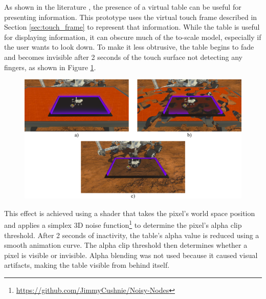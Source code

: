         As shown in the literature \cite{zielaskoMenusDeskSystem2019, sousaVRRRRoomVirtualReality2017, zielaskoNonStationaryOfficeDesk2019}, the presence of a virtual table can be useful for presenting information. This prototype uses the virtual touch frame described in Section \ref{sec:touch_frame} to represent that information. While the table is useful for displaying information, it can obscure much of the to-scale model, especially if the user wants to look down. To make it less obtrusive, the table begins to fade and becomes invisible after 2 seconds of the touch surface not detecting any fingers, as shown in Figure \ref{fig:table_visibility}.

        \begin{figure}[h!]
            \centering
            \includegraphics[width=1\textwidth]{figures/table_visibility.png}
            \label{fig:table_visibility}
        \end{figure}

        This effect is achieved using a shader that takes the pixel's world space position and applies a simplex 3D noise function\footnote{\url{https://github.com/JimmyCushnie/Noisy-Nodes}} to determine the pixel's alpha clip threshold. After 2 seconds of inactivity, the table's alpha value is reduced using a smooth animation curve. The alpha clip threshold then determines whether a pixel is visible or invisible. Alpha blending was not used because it caused visual artifacts, making the table visible from behind itself.


